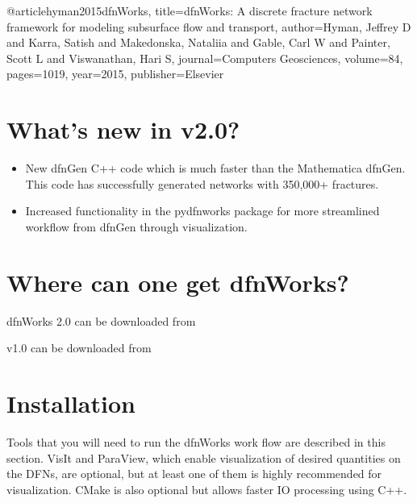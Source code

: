 \documentclass[letterpaper,10pt,english]{sphinxmanual}
\begin{document}

\begin{sphinxVerbatim}[commandchars=\\\{\}]
  @article\PYGZob{}hyman2015dfnWorks,
    title=\PYGZob{}dfnWorks: A discrete fracture network framework
for modeling subsurface flow and transport\PYGZcb{},
    author=\PYGZob{}Hyman, Jeffrey D and Karra, Satish and Makedonska,
Nataliia and Gable, Carl W and Painter, Scott L
and Viswanathan, Hari S\PYGZcb{},
    journal=\PYGZob{}Computers \PYGZbs{}\PYGZam{} Geosciences\PYGZcb{},
    volume=\PYGZob{}84\PYGZcb{},
    pages=\PYGZob{}10\PYGZhy{}\PYGZhy{}19\PYGZcb{},
    year=\PYGZob{}2015\PYGZcb{},
    publisher=\PYGZob{}Elsevier\PYGZcb{}
  \PYGZcb{}
\end{sphinxVerbatim}


\section{What's new in v2.0?}
\label{\detokenize{intro:what-s-new-in-v2-0}}\begin{itemize}
\item {} 
New dfnGen C++ code which is much faster than the Mathematica dfnGen. This code has successfully generated networks with 350,000+ fractures.

\item {} 
Increased functionality in the pydfnworks package for more streamlined workflow from dfnGen through visualization.

\end{itemize}


\section{Where can one get dfnWorks?}
\label{\detokenize{intro:where-can-one-get-dfnworks}}
dfnWorks 2.0 can be downloaded from 

v1.0 can be downloaded from 


\section{Installation}
\label{\detokenize{intro:installation}}
Tools that you will need to run the dfnWorks work flow are described in
this section. VisIt and ParaView, which enable visualization of desired
quantities on the DFNs, are optional, but at least one of them is highly
recommended for visualization. CMake is also optional but allows faster IO
processing using C++.
\end{document}
